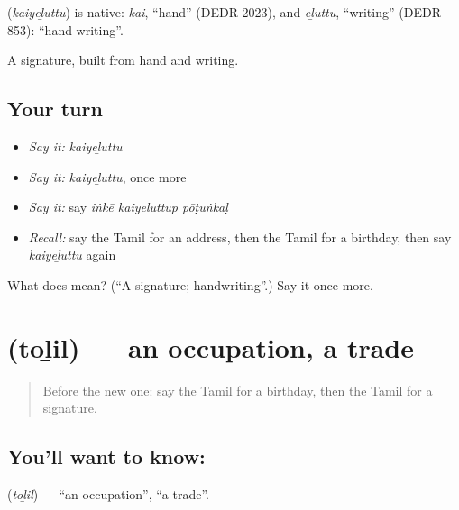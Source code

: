 \begin{cousinweb}
\textbf{} (\emph{kaiyeḻuttu}) is native: \emph{kai}, \textquotedblleft{}hand\textquotedblright{} (DEDR 2023), and \emph{eḻuttu}, \textquotedblleft{}writing\textquotedblright{} (DEDR 853): \textquotedblleft{}hand-writing\textquotedblright{}.
\end{cousinweb}

\begin{grammarlens}[title={What you've built}]
A signature, built from hand and writing.
\end{grammarlens}

\subsection*{Your turn}
\begin{itemize}
\raggedright
  \item \emph{Say it:} \emph{kaiyeḻuttu}
  \item \emph{Say it:} \emph{kaiyeḻuttu}, once more
  \item \emph{Say it:} say \emph{iṅkē kaiyeḻuttup pōṭuṅkaḷ}
  \item \emph{Recall:} say the Tamil for an address, then the Tamil for a birthday, then say \emph{kaiyeḻuttu} again
\end{itemize}

\begin{tcolorbox}[breakable,colback=teal!4,colframe=teal!35!black,title={Before you move on}]
What does  mean? (\textquotedblleft{}A signature; handwriting\textquotedblright{}.) Say it once more.
\end{tcolorbox}
\section[\texorpdfstring{\ta{தொழில்} (toḻil)}{தொழில் (toḻil)}]{ (toḻil) — an occupation, a trade}

\label{lesson:TA-C105-occupation}



\begin{quote}
Before the new one: say the Tamil for a birthday, then the Tamil for a signature.
\end{quote}

\subsection*{You'll want to know: }
\textbf{} (\emph{toḻil}) — \textquotedblleft{}an occupation\textquotedblright{}, \textquotedblleft{}a trade\textquotedblright{}.


